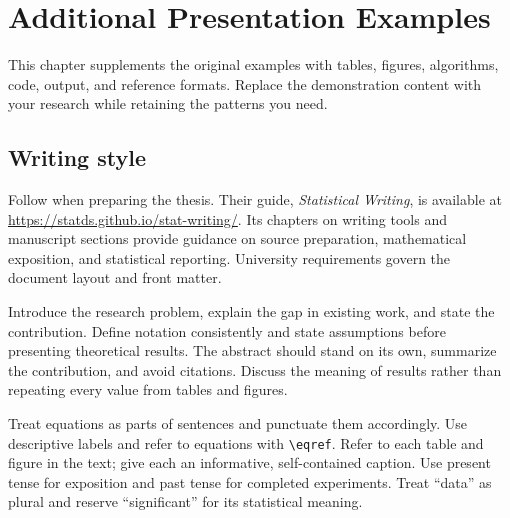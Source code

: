 \chapter{Additional Presentation Examples}
\label{chap:presentation}
This chapter supplements the original examples with tables, figures,
algorithms, code, output, and reference formats. Replace the demonstration
content with your research while retaining the patterns you need.


\section{Writing style}
Follow \citet{schifano2026statistical} when preparing the thesis. Their guide,
\emph{Statistical Writing}, is available at
\url{https://statds.github.io/stat-writing/}. Its chapters on writing tools and
manuscript sections provide guidance on source preparation, mathematical
exposition, and statistical reporting. University requirements govern the
document layout and front matter.


Introduce the research problem, explain the gap in existing work, and state the
contribution. Define notation consistently and state assumptions before
presenting theoretical results. The abstract should stand on its own, summarize
the contribution, and avoid citations. Discuss the meaning of results rather
than repeating every value from tables and figures.


Treat equations as parts of sentences and punctuate them accordingly. Use
descriptive labels and refer to equations with \verb|\eqref|. Refer to each
table and figure in the text; give each an informative, self-contained caption.
Use present tense for exposition and past tense for completed experiments.
Treat ``data'' as plural and reserve ``significant'' for its statistical
meaning.



